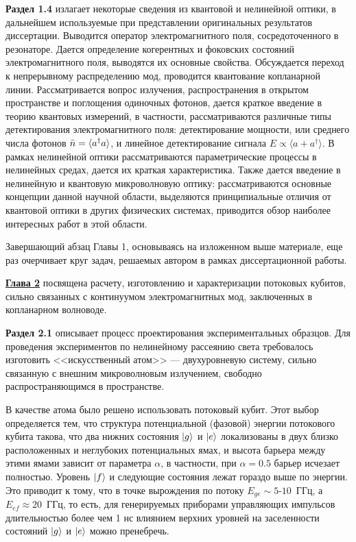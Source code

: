 \textbf{Раздел 1.4} излагает некоторые сведения из квантовой и нелинейной оптики, в дальнейшем используемые при представлении оригинальных результатов диссертации. Выводится оператор электромагнитного поля, сосредоточенного в резонаторе. Дается определение когерентных и фоковских состояний электромагнитного поля, выводятся их основные свойства. Обсуждается переход к непрерывному распределению мод, проводится квантование копланарной линии. Рассматривается вопрос излучения, распространения в открытом пространстве и поглощения одиночных фотонов, дается краткое введение в теорию квантовых измерений, в частности, рассматриваются различные типы детектирования электромагнитного поля: детектирование мощности, или среднего числа фотонов $\bar{n}= \braket{a^\dag a}$, и линейное детектирование сигнала $E\propto \langle a+a^\dag\rangle$. В рамках нелинейной оптики рассматриваются параметрические процессы в нелинейных средах, дается их краткая характеристика. Также дается введение в нелинейную и квантовую микроволновую оптику: рассматриваются основные концепции данной научной области, выделяются принципиальные отличия от квантовой оптики в других физических системах, приводится обзор наиболее интересных работ в этой области.

Завершающий абзац Главы 1, основываясь на изложенном выше материале, еще раз очерчивает круг задач, решаемых автором в рамках диссертационной работы.

\underline{\textbf{Глава 2}} посвящена расчету, изготовлению и характеризации потоковых кубитов, сильно связанных с континуумом электромагнитных мод, заключенных в копланарном волноводе. 

\textbf{Раздел 2.1} описывает процесс проектирования экспериментальных образцов. Для проведения экспериментов по нелинейному рассеянию света требовалось изготовить <<искусственный атом>> --- двухуровневую систему, сильно связанную с внешним микроволновым излучением, свободно распространяющимся в пространстве. 

В качестве атома было решено использовать потоковый кубит. Этот выбор определяется тем, что структура потенциальной (фазовой) энергии потокового кубита такова, что два нижних состояния $\ket{g}$ и $\ket{e}$ локализованы в двух близко расположенных и неглубоких потенциальных ямах, и высота барьера между этими ямами зависит от параметра $\alpha$, в частности, при $\alpha=0.5$ барьер исчезает полностью. Уровень $\ket{f}$ и следующие состояния лежат гораздо выше по энергии.  Это приводит к тому, что в точке вырождения по потоку $E_{ge} \sim 5$-$10$~ГГц, а $E_{ef} \approx 20$~ГГц, то есть, для генерируемых приборами управляющих импульсов длительностью более чем 1 нс влиянием верхних уровней на заселенности состояний $\ket{g}$ и $\ket{e}$ можно пренебречь. 

